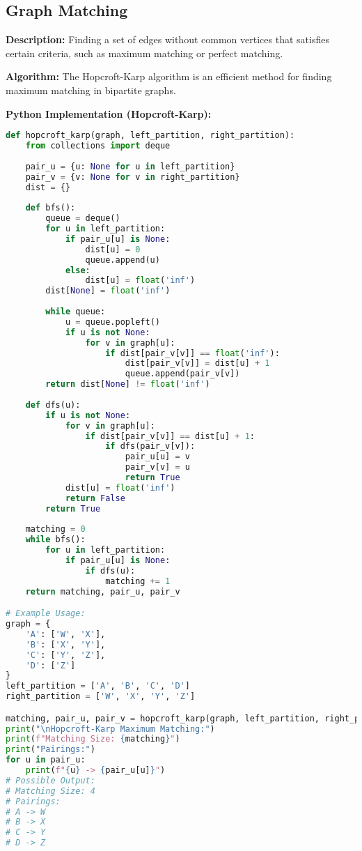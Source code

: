 \subsection{Graph Matching}

\textbf{Description:}  
Finding a set of edges without common vertices that satisfies certain criteria, such as maximum matching or perfect matching.

\textbf{Algorithm:}  
The Hopcroft-Karp algorithm is an efficient method for finding maximum matching in bipartite graphs.

\textbf{Python Implementation (Hopcroft-Karp):}

\begin{lstlisting}[language=Python, xleftmargin=0.02\textwidth, xrightmargin=0.02\textwidth]
def hopcroft_karp(graph, left_partition, right_partition):
    from collections import deque
    
    pair_u = {u: None for u in left_partition}
    pair_v = {v: None for v in right_partition}
    dist = {}
    
    def bfs():
        queue = deque()
        for u in left_partition:
            if pair_u[u] is None:
                dist[u] = 0
                queue.append(u)
            else:
                dist[u] = float('inf')
        dist[None] = float('inf')
        
        while queue:
            u = queue.popleft()
            if u is not None:
                for v in graph[u]:
                    if dist[pair_v[v]] == float('inf'):
                        dist[pair_v[v]] = dist[u] + 1
                        queue.append(pair_v[v])
        return dist[None] != float('inf')
    
    def dfs(u):
        if u is not None:
            for v in graph[u]:
                if dist[pair_v[v]] == dist[u] + 1:
                    if dfs(pair_v[v]):
                        pair_u[u] = v
                        pair_v[v] = u
                        return True
            dist[u] = float('inf')
            return False
        return True
    
    matching = 0
    while bfs():
        for u in left_partition:
            if pair_u[u] is None:
                if dfs(u):
                    matching += 1
    return matching, pair_u, pair_v

# Example Usage:
graph = {
    'A': ['W', 'X'],
    'B': ['X', 'Y'],
    'C': ['Y', 'Z'],
    'D': ['Z']
}
left_partition = ['A', 'B', 'C', 'D']
right_partition = ['W', 'X', 'Y', 'Z']

matching, pair_u, pair_v = hopcroft_karp(graph, left_partition, right_partition)
print("\nHopcroft-Karp Maximum Matching:")
print(f"Matching Size: {matching}")
print("Pairings:")
for u in pair_u:
    print(f"{u} -> {pair_u[u]}")
# Possible Output:
# Matching Size: 4
# Pairings:
# A -> W
# B -> X
# C -> Y
# D -> Z
\end{lstlisting}

